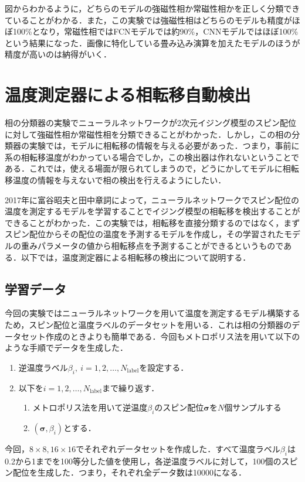 \documentclass[a4paper,11pt]{jsreport}
\begin{document}
図からわかるように，どちらのモデルの強磁性相か常磁性相かを正しく分類できていることがわかる．また，この実験では強磁性相はどちらのモデルも精度がほぼ100\%となり，常磁性相ではFCNモデルでは約90\%，CNNモデルではほぼ100\%という結果になった．画像に特化している畳み込み演算を加えたモデルのほうが精度が高いのは納得がいく．







\section{温度測定器による相転移自動検出}
相の分類器の実験でニューラルネットワークが2次元イジング模型のスピン配位に対して強磁性相か常磁性相を分類できることがわかった．しかし，この相の分類器の実験では，モデルに相転移の情報を与える必要があった．つまり，事前に系の相転移温度がわかっている場合でしか，この検出器は作れないということである．これでは，使える場面が限られてしまうので，どうにかしてモデルに相転移温度の情報を与えないで相の検出を行えるようにしたい．\par
2017年に富谷昭夫と田中章詞によって，ニューラルネットワークでスピン配位の温度を測定するモデルを学習することでイジング模型の相転移を検出することができることがわかった．\cite{tanaka2017detection}この実験では，相転移を直接分類するのではなく，まずスピン配位からその配位の温度を予測するモデルを作成し，その学習されたモデルの重みパラメータの値から相転移点を予測することができるというものである．以下では，温度測定器による相転移の検出について説明する．

\subsection{学習データ}
今回の実験ではニューラルネットワークを用いて温度を測定するモデル構築するため，スピン配位と温度ラベルのデータセットを用いる．これは相の分類器のデータセット作成のときよりも簡単である．今回もメトロポリス法を用いて以下のような手順でデータを生成した．\par
\begin{enumerate}
  \item 逆温度ラベル$\beta_i, \ i=1,2,\dots,N_{\text{label}}$を設定する．
  \item 以下を$i=1,2,\dots,N_{\text{label}}$まで繰り返す．
  \begin{enumerate}
    \item メトロポリス法を用いて逆温度$\beta_i$のスピン配位$\bm{\sigma}$を$N$個サンプルする
    \item $(\bm{\sigma},\beta_i)$とする．
  \end{enumerate}
\end{enumerate}
今回，$8 \times 8, 16 \times 16$でそれぞれデータセットを作成した．すべて温度ラベル$\beta_i$は0.2から1までを100等分した値を使用し，各逆温度ラベルに対して，100個のスピン配位を生成した．つまり，それぞれ全データ数は10000になる．
\end{document}
